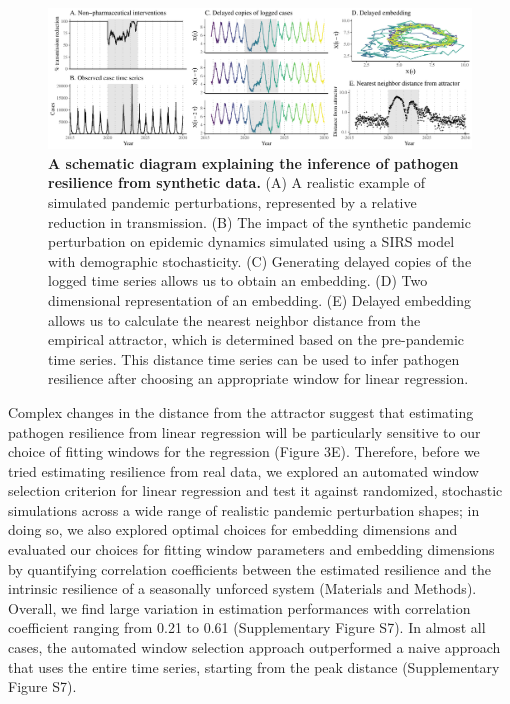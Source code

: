 \documentclass[12pt]{article}
\begin{document}
\begin{figure}[!ht]
\includegraphics[width=\textwidth]{../figure3/figure3.pdf}
\caption{
\textbf{A schematic diagram explaining the inference of pathogen resilience from synthetic data.}
(A) A realistic example of simulated pandemic perturbations, represented by a relative reduction in transmission.
(B) The impact of the synthetic pandemic perturbation on epidemic dynamics simulated using a SIRS model with demographic stochasticity.
(C) Generating delayed copies of the logged time series allows us to obtain an embedding.
(D) Two dimensional representation of an embedding.
(E) Delayed embedding allows us to calculate the nearest neighbor distance from the empirical attractor, which is determined based on the pre-pandemic time series.
This distance time series can be used to infer pathogen resilience after choosing an appropriate window for linear regression.
}
\end{figure}

Complex changes in the distance from the attractor suggest that estimating pathogen resilience from linear regression will be particularly sensitive to our choice of fitting windows for the regression (Figure 3E).
Therefore, before we tried estimating resilience from real data, we explored an automated window selection criterion for linear regression and test it against randomized, stochastic simulations across a wide range of realistic pandemic perturbation shapes;
in doing so, we also explored optimal choices for embedding dimensions and evaluated our choices for fitting window parameters and embedding dimensions by quantifying correlation coefficients between the estimated resilience and the intrinsic resilience of a seasonally unforced system (Materials and Methods).
Overall, we find large variation in estimation performances with correlation coefficient ranging from 0.21 to 0.61 (Supplementary Figure S7).
In almost all cases, the automated window selection approach outperformed a naive approach that uses the entire time series, starting from the peak distance (Supplementary Figure S7).
\end{document}
